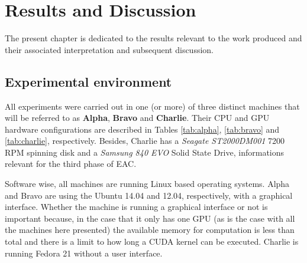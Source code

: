 


\chapter{Results and Discussion}
\label{chapter:results}

The present chapter is dedicated to the results relevant to the work produced and their associated interpretation and subsequent discussion.

%

%
%

\section{Experimental environment}
\label{sec:system configs}

All experiments were carried out in one (or more) of three distinct machines that will be referred to as \textbf{Alpha}, \textbf{Bravo} and \textbf{Charlie}.
Their CPU and GPU hardware configurations are described in Tables \ref{tab:alpha}, \ref{tab:bravo} and \ref{tab:charlie}, respectively.
Besides, Charlie has a \emph{Seagate ST2000DM001} 7200 RPM spinning disk and a \emph{Samsung 840 EVO} Solid State Drive, informations relevant for the third phase of EAC.%

Software wise, all machines are running Linux based operating systems.
Alpha and Bravo are using the Ubuntu 14.04 and 12.04, respectively, with a graphical interface.
Whether the machine is running a graphical interface or not is important because, in the case that it only has one GPU (as is the case with all the machines here presented) the available memory for computation is less than total and there is a limit to how long a CUDA kernel can be executed.
Charlie is running Fedora 21 without a user interface.

